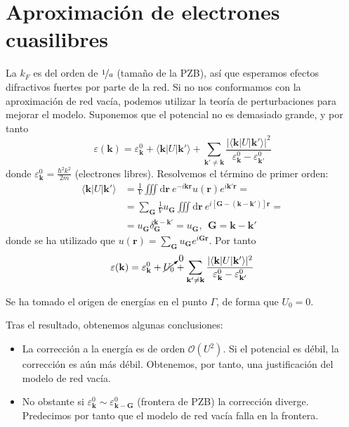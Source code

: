 \section{Aproximación de electrones cuasilibres}
La $k_F$ es del orden de $\nicefrac{1}{a}$ (tamaño de la PZB), así que
esperamos efectos difractivos fuertes por parte de la red. Si no nos
conformamos con la aproximación de red vacía, podemos utilizar la
teoría de perturbaciones para mejorar el modelo.
Suponemos que el potencial no es demasiado grande, y por tanto
\begin{equation}
  \varepsilon(\mathbf{k}) =  \varepsilon_\mathbf{k}^0 + \langle
  \mathbf{k} | U | \mathbf{k'}\rangle + \sum_{\mathbf{k'} \neq
    \mathbf{k}}\frac{|\langle \mathbf{k} | U |
    \mathbf{k'}\rangle|^2}{\varepsilon_\mathbf{k}^0 - \varepsilon_\mathbf{k'}^0}
\end{equation}
donde $\varepsilon_\mathbf{k}^0 =\frac{\hbar^2 k^2}{2m}$ (electrones
libres). Resolvemos el término de primer orden:
\begin{equation}
  \begin{split}
    \langle \mathbf{k} | U | \mathbf{k'}\rangle &= \frac{1}{V} \iiint
    \text{d}\mathbf{r}\ e^{-i \mathbf{k}\mathbf{r}} u(\mathbf{r}) e^{i
    \mathbf{k'} \mathbf{r}} = \\
  &= \sum_{\mathbf{G}}  \frac{1}{V} u_\mathbf{G} \iiint
  \text{d}\mathbf{r} \ e^{i [\mathbf{G} -
    (\mathbf{k}-\mathbf{k'})]\mathbf{r}} = \\
  &= u_\mathbf{G} \delta_\mathbf{G}^{\mathbf{k}-\mathbf{k'}} =
  u_\mathbf{G}, \ \ \mathbf{G}=\mathbf{k}-\mathbf{k'}
  \end{split}
\end{equation}
donde se ha utilizado que $u(\mathbf{r}) = \sum_{\mathbf{G}}
u_\mathbf{G} e^{i \mathbf{G}\mathbf{r}}$. Por tanto
\begin{equation}
  \varepsilon(\mathbf{k}) = \varepsilon_\mathbf{k}^0 +
  \cancelto{0}{U_0} + \sum_{\mathbf{k'} \neq
    \mathbf{k}}\frac{|\langle \mathbf{k} | U |
    \mathbf{k'}\rangle|^2}{\varepsilon_\mathbf{k}^0 - \varepsilon_\mathbf{k'}^0}
\end{equation}

Se ha tomado el origen de energías en el punto $\Gamma$, de forma que
$U_0 = 0$.

Tras el resultado, obtenemos algunas conclusiones:
\begin{itemize}
\item La corrección a la energía es de orden $\mathcal{O}(U^2)$. Si el
potencial es débil, la corrección es aún más débil. Obtenemos, por
tanto, una justificación del modelo de red vacía.
\item No obstante si
  $\varepsilon_\mathbf{k}^0 \sim
  \varepsilon_{\mathbf{k}-\mathbf{G}}^0$
  (frontera de PZB) la corrección diverge. Predecimos por tanto que el
  modelo de red vacía falla en la frontera.
\end{itemize}


